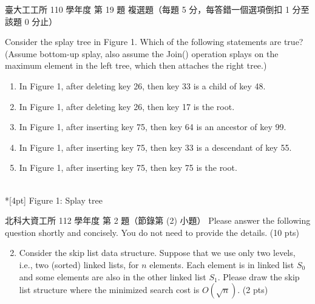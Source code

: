 \begin{pastexam}[label={px:bal-4}]{臺大工工所 110 學年度 第 19 題}
複選題（每題 5 分，每答錯一個選項倒扣 1 分至該題 0 分止）

Consider the splay tree in Figure 1. Which of the following statements are true?\\
(Assume bottom-up splay, also assume the Join() operation splays on the maximum element in
the left tree, which then attaches the right tree.)
\begin{enumerate}[label=(\Alph*)]
\item In Figure 1, after deleting key 26, then key 33 is a child of key 48.
\item In Figure 1, after deleting key 26, then key 17 is the root.
\item In Figure 1, after inserting key 75, then key 64 is an ancestor of key 99.
\item In Figure 1, after inserting key 75, then key 33 is a descendant of key 55.
\item In Figure 1, after inserting key 75, then key 75 is the root.
\end{enumerate}
\begin{center}
\\*[4pt] Figure 1: Splay tree
\end{center}
\end{pastexam}

\begin{pastexam}[label={px:bal-5}]{北科大資工所 112 學年度 第 2 題（節錄第 (2) 小題）}
Please answer the following question shortly and concisely. You do not need to provide
the details. (10 pts)
\begin{enumerate}[label=(\arabic*)]
\setcounter{enumi}{1}
\item Consider the skip list data structure. Suppose that we use only two levels, i.e., two
(sorted) linked lists, for $n$ elements. Each element is in linked list $S_0$ and some
elements are also in the other linked list $S_1$. Please draw the skip list structure where
the minimized search cost is $O(\sqrt{n})$. (2 pts)
\end{enumerate}
\end{pastexam}

